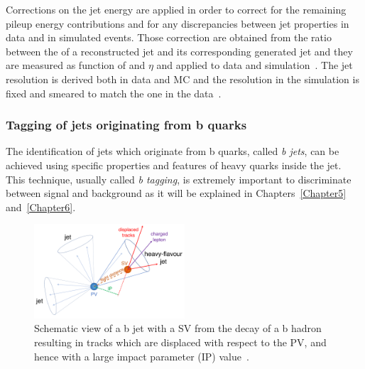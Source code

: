 Corrections on the jet energy are applied in order to correct for the
remaining pileup energy contributions and for any discrepancies
between jet properties in data and in simulated events. Those
correction are obtained from the ratio between the \pt of a
reconstructed jet and its corresponding generated jet and they are
measured as function of \pt and $\eta$ and applied to data and
simulation~\cite{Khachatryan_2017}. The jet \pt resolution is
derived both in data and MC and the resolution in the simulation is
fixed and smeared to match the one in the
data~\cite{Khachatryan_2017}.

\subsubsection{Tagging of jets originating from b
  quarks}\label{sec:tagging}
The identification of jets which originate from b quarks, called
\emph{b jets}, can be achieved using
specific properties and features of heavy
quarks inside the jet. This technique, usually called \emph{b tagging}, is
extremely important to discriminate between signal and background as
it will be explained in Chapters~\ref{Chapter5}
and~\ref{Chapter6}.

\begin{figure}[h]
\centering
    \includegraphics[clip,trim=0.3cm 0.5cm 0.3cm 0.3cm, width=0.50\textwidth]{Figures/c2/tagging}
  \caption{Schematic view of a b jet with a SV from the decay of a b hadron resulting in tracks which are displaced with respect to the PV, and hence with a large impact parameter (IP) value~\cite{Sirunyan_2018_tagging}.}
\label{fig:btagging}
\end{figure}

